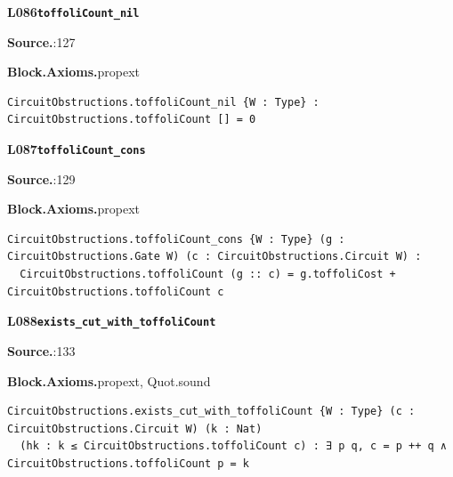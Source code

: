 \par\medskip\noindent\begin{minipage}{\textwidth}
{\small\bfseries L086\enspace\texttt{toffoliCount\_nil}\par}
{\footnotesize\raggedright\textbf{Source.}\enspace{}:127\par
\textbf{Block.}\quad\textbf{Axioms.}\enspace propext\par}\nopagebreak
\begin{lstlisting}
CircuitObstructions.toffoliCount_nil {W : Type} : CircuitObstructions.toffoliCount [] = 0
\end{lstlisting}
\end{minipage}\par

\par\medskip\noindent\begin{minipage}{\textwidth}
{\small\bfseries L087\enspace\texttt{toffoliCount\_cons}\par}
{\footnotesize\raggedright\textbf{Source.}\enspace{}:129\par
\textbf{Block.}\quad\textbf{Axioms.}\enspace propext\par}\nopagebreak
\begin{lstlisting}
CircuitObstructions.toffoliCount_cons {W : Type} (g : CircuitObstructions.Gate W) (c : CircuitObstructions.Circuit W) :
  CircuitObstructions.toffoliCount (g :: c) = g.toffoliCost + CircuitObstructions.toffoliCount c
\end{lstlisting}
\end{minipage}\par

\par\medskip\noindent\begin{minipage}{\textwidth}
{\small\bfseries L088\enspace\texttt{exists\_cut\_with\_toffoliCount}\par}
{\footnotesize\raggedright\textbf{Source.}\enspace{}:133\par
\textbf{Block.}\quad\textbf{Axioms.}\enspace propext, Quot.sound\par}\nopagebreak
\begin{lstlisting}
CircuitObstructions.exists_cut_with_toffoliCount {W : Type} (c : CircuitObstructions.Circuit W) (k : Nat)
  (hk : k ≤ CircuitObstructions.toffoliCount c) : ∃ p q, c = p ++ q ∧ CircuitObstructions.toffoliCount p = k
\end{lstlisting}
\end{minipage}\par


